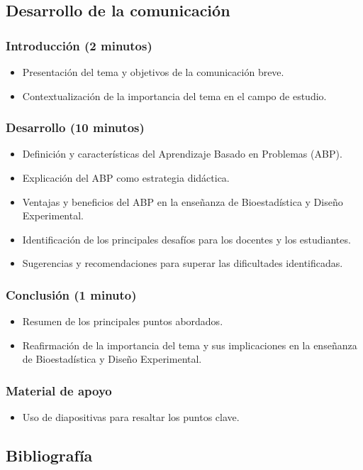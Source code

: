 \subsection{Desarrollo de la comunicación}

\subsubsection{Introducción (2 minutos)}

\begin{itemize}
	\item Presentación del tema y objetivos de la comunicación breve.
	\item Contextualización de la importancia del tema en el campo de estudio.
\end{itemize}

\subsubsection{Desarrollo (10 minutos)}

\begin{itemize}
	\item Definición y características del Aprendizaje Basado en Problemas (ABP).
	\item Explicación del ABP como estrategia didáctica.
	\item Ventajas y beneficios del ABP en la enseñanza de Bioestadística y Diseño Experimental.
	\item Identificación de los principales desafíos para los docentes y los estudiantes.
	\item Sugerencias y recomendaciones para superar las dificultades identificadas.
\end{itemize}

\subsubsection{Conclusión (1 minuto)}

\begin{itemize}
	\item Resumen de los principales puntos abordados.
	\item Reafirmación de la importancia del tema y sus implicaciones en la enseñanza de Bioestadística y Diseño Experimental.
\end{itemize}

\subsubsection{Material de apoyo}

\begin{itemize}
	\item Uso de diapositivas para resaltar los puntos clave.
\end{itemize}

\subsection{Bibliografía}

\nocite{*}
\printbibliography[keyword={15}]